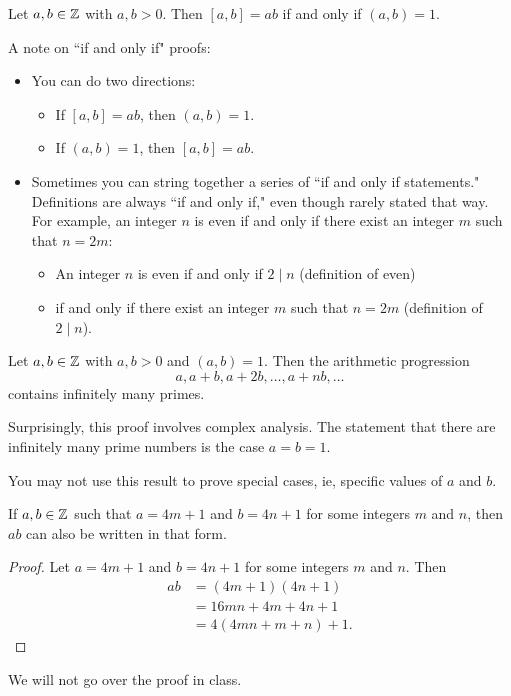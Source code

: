 \documentclass{ximera}
\begin{document}
\begin{corollary}\label{cor:lcm-gcd}
 Let $a,b\in\mathbb Z$ with $a,b>0$. Then $[a,b]=ab$ if and only if $(a,b)=1$.
\end{corollary}
A note on ``if and only if" proofs: 
\begin{itemize}
 \item You can do two directions: 
\begin{itemize}
 \item  If $[a,b]=ab$, then $(a,b)=1$.
 \item  If $(a,b)=1$, then $[a,b]=ab$.
\end{itemize}
\item Sometimes you can string together a series of ``if and only if statements." Definitions are always ``if and only if," even though rarely stated that way. For example, an integer $n$ is even if and only if there exist an integer $m$ such that $n=2m$:
\begin{itemize}
 \item An integer $n$ is even if and only if $2\mid n$ (definition of even) 
 \item if and only if there exist an integer $m$ such that $n=2m$ (definition of $2\mid n$).
\end{itemize}
\end{itemize}

\begin{theorem}\label{thm:dirichlet}
 Let $a,b\in\mathbb Z$ with $a,b>0$ and $(a,b)=1$. Then the arithmetic progression \[a,a+b, a+2b, \dots, a+nb,\dots\]
 contains infinitely many primes.
\end{theorem}
Surprisingly, this proof involves complex analysis. The statement that there are infinitely many prime numbers is the case $a=b=1$.


\begin{warning}
    You may not use this result to prove special cases, ie, specific values of $a$ and $b$.
\end{warning}


\begin{lemma}[Lemma 1.23]\label{lem:prod-goodprimes}
    If $a,b\in\mathbb Z$ such that $a=4m+1$ and $b=4n+1$ for some integers $m$ and $n$, then $ab$ can also be written in that form.
    \begin{proof}
        Let $a=4m+1$ and $b=4n+1$ for some integers $m$ and $n$. Then 
        \begin{align*}
            ab&=(4m+1)(4n+1)\\
            &=16mn+4m+4n+1\\
            &=4(4mn+m+n)+1.
        \end{align*}
    \end{proof}
\end{lemma}
We will not go over the proof in class.
\end{document}
